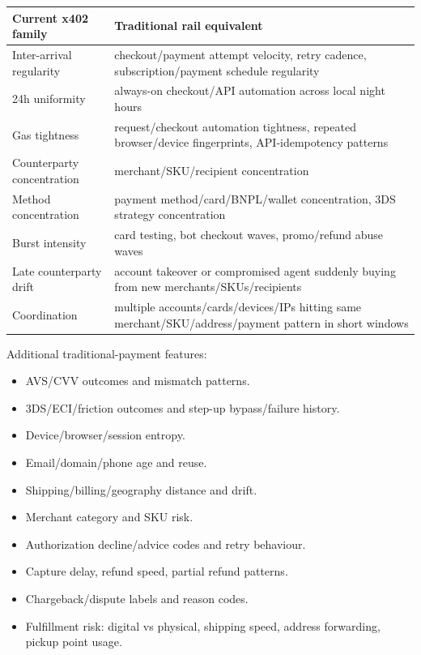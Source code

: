 \documentclass[11pt]{article}
\begin{document}
\begin{center}
\begin{tabular}{ll}
\toprule
Current x402 family & Traditional rail equivalent \\
\midrule
Inter-arrival regularity & checkout/payment attempt velocity, retry cadence, subscription/payment schedule regularity \\
24h uniformity & always-on checkout/API automation across local night hours \\
Gas tightness & request/checkout automation tightness, repeated browser/device fingerprints, API-idempotency patterns \\
Counterparty concentration & merchant/SKU/recipient concentration \\
Method concentration & payment method/card/BNPL/wallet concentration, 3DS strategy concentration \\
Burst intensity & card testing, bot checkout waves, promo/refund abuse waves \\
Late counterparty drift & account takeover or compromised agent suddenly buying from new merchants/SKUs/recipients \\
Coordination & multiple accounts/cards/devices/IPs hitting same merchant/SKU/address/payment pattern in short windows \\
\bottomrule
\end{tabular}
\end{center}

Additional traditional-payment features:

\begin{itemize}
  \item AVS/CVV outcomes and mismatch patterns.
  \item 3DS/ECI/friction outcomes and step-up bypass/failure history.
  \item Device/browser/session entropy.
  \item Email/domain/phone age and reuse.
  \item Shipping/billing/geography distance and drift.
  \item Merchant category and SKU risk.
  \item Authorization decline/advice codes and retry behaviour.
  \item Capture delay, refund speed, partial refund patterns.
  \item Chargeback/dispute labels and reason codes.
  \item Fulfillment risk: digital vs physical, shipping speed, address forwarding, pickup point usage.
\end{itemize}
\end{document}
